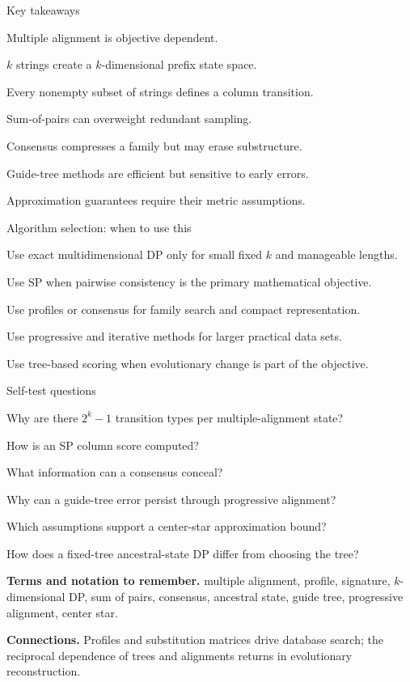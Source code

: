 \documentclass[11pt,letterpaper]{article}
\begin{document}
\begin{CornellSummaryBox}{Key takeaways}
\begin{CornellRecallList}
  \item Multiple alignment is objective dependent.
  \item $k$ strings create a $k$-dimensional prefix state space.
  \item Every nonempty subset of strings defines a column transition.
  \item Sum-of-pairs can overweight redundant sampling.
  \item Consensus compresses a family but may erase substructure.
  \item Guide-tree methods are efficient but sensitive to early errors.
  \item Approximation guarantees require their metric assumptions.
\end{CornellRecallList}
\end{CornellSummaryBox}

\begin{CornellOverviewBox}{Algorithm selection: when to use this}
\begin{CornellChecklist}
  \item Use exact multidimensional DP only for small fixed $k$ and manageable lengths.
  \item Use SP when pairwise consistency is the primary mathematical objective.
  \item Use profiles or consensus for family search and compact representation.
  \item Use progressive and iterative methods for larger practical data sets.
  \item Use tree-based scoring when evolutionary change is part of the objective.
\end{CornellChecklist}
\end{CornellOverviewBox}

\begin{CornellExamBox}{Self-test questions}
\begin{CornellRecallList}
  \item Why are there $2^k-1$ transition types per multiple-alignment state?
  \item How is an SP column score computed?
  \item What information can a consensus conceal?
  \item Why can a guide-tree error persist through progressive alignment?
  \item Which assumptions support a center-star approximation bound?
  \item How does a fixed-tree ancestral-state DP differ from choosing the tree?
\end{CornellRecallList}
\end{CornellExamBox}

{\footnotesize
\textbf{Terms and notation to remember.} multiple alignment, profile, signature, $k$-dimensional DP, sum of pairs, consensus, ancestral state, guide tree, progressive alignment, center star.

\textbf{Connections.} Profiles and substitution matrices drive database search; the reciprocal dependence of trees and alignments returns in evolutionary reconstruction.
}
\end{document}
